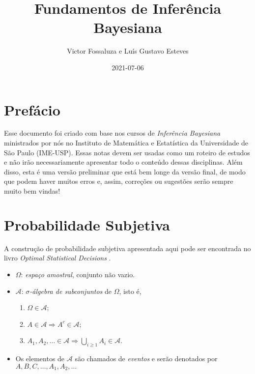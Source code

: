 \documentclass[
]{book}
\title{Fundamentos de Inferência Bayesiana}
\author{Victor Fossaluza e Luís Gustavo Esteves}
\date{2021-07-06}
\providecommand{\tightlist}{%
  \setlength{\itemsep}{0pt}\setlength{\parskip}{0pt}}
\begin{document}
\maketitle

{
\setcounter{tocdepth}{1}
\tableofcontents
}
\hypertarget{prefuxe1cio}{%
\chapter{Prefácio}\label{prefuxe1cio}}

Esse documento foi criado com base nos cursos de \emph{Inferência Bayesiana} ministrados por nós no Instituto de Matemática e Estatística da Universidade de São Paulo (IME-USP). Essas notas devem ser usadas como um roteiro de estudos e não irão necessariamente apresentar todo o conteúdo dessas disciplinas. Além disso, esta é uma versão preliminar que está bem longe da versão final, de modo que podem haver muitos erros e, assim, correções ou sugestões serão sempre muito bem vindas!

\hypertarget{ProbSubj}{%
\chapter{Probabilidade Subjetiva}\label{ProbSubj}}

A construção de probabilidade subjetiva apresentada aqui pode ser encontrada no livro \emph{Optimal Statistical Decisions} \citep{DeGroot70}.

\begin{itemize}
\item
  \(\Omega\): \emph{espaço amostral}, conjunto não vazio.
\item
  \(\mathcal{A}\): \emph{\(\sigma\)-álgebra de subconjuntos} de \(\Omega\), isto é,

  \begin{enumerate}
  \def\labelenumi{\arabic{enumi}.}
  \tightlist
  \item
    \(\Omega \in \mathcal{A}\);
  \item
    \(A \in \mathcal{A} \Longrightarrow A^{c} \in \mathcal{A}\);
  \item
    \(\displaystyle A_1, A_2, \ldots \in \mathcal{A} \Longrightarrow \bigcup_{i\geq1} A_i \in \mathcal{A}\).
  \end{enumerate}
\item
  Os elementos de \(\mathcal{A}\) são chamados de \emph{eventos} e serão denotados por \(A, B, C, \ldots, A_1, A_2, \ldots\)
\end{itemize}
\end{document}
